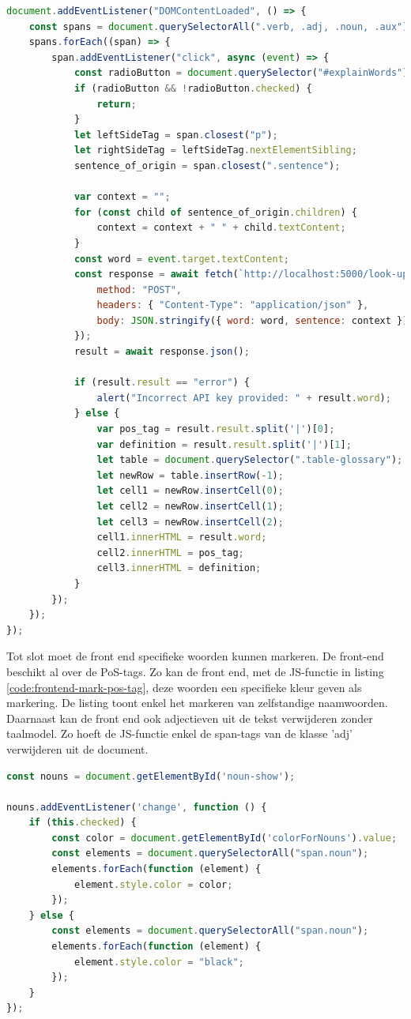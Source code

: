 \begin{lstlisting}[language=javascript, caption={Een woord aan de woordenlijst toevoegen in het scholierencomponent.}, label={code:frontend-add-word-to-glossary}]
document.addEventListener("DOMContentLoaded", () => {
	const spans = document.querySelectorAll(".verb, .adj, .noun, .aux");
	spans.forEach((span) => {
		span.addEventListener("click", async (event) => {
			const radioButton = document.querySelector("#explainWords");
			if (radioButton && !radioButton.checked) {
				return;
			}
			let leftSideTag = span.closest("p");
			let rightSideTag = leftSideTag.nextElementSibling;
			sentence_of_origin = span.closest(".sentence");
			
			var context = "";
			for (const child of sentence_of_origin.children) {
				context = context + " " + child.textContent;
			}
			const word = event.target.textContent;
			const response = await fetch(`http://localhost:5000/look-up-word`, {
				method: "POST",
				headers: { "Content-Type": "application/json" },
				body: JSON.stringify({ word: word, sentence: context }),
			});
			result = await response.json();
			
			if (result.result == "error") {
				alert("Incorrect API key provided: " + result.word);
			} else {
				var pos_tag = result.result.split('|')[0];
				var definition = result.result.split('|')[1];
				let table = document.querySelector(".table-glossary");
				let newRow = table.insertRow(-1);
				let cell1 = newRow.insertCell(0);
				let cell2 = newRow.insertCell(1);
				let cell3 = newRow.insertCell(2);
				cell1.innerHTML = result.word;
				cell2.innerHTML = pos_tag;
				cell3.innerHTML = definition;
			}
		});
	});
});
\end{lstlisting}


Tot slot moet de front end specifieke woorden kunnen markeren. De front-end beschikt al over de PoS-tags. Zo kan de front end, met de JS-functie in listing \ref{code:frontend-mark-pos-tag}, deze woorden een specifieke kleur geven als markering. De listing toont enkel het markeren van zelfstandige naamwoorden. Daarnaast kan de front end ook adjectieven uit de tekst verwijderen zonder taalmodel. Zo hoeft de JS-functie enkel de span-tags van de klasse 'adj' verwijderen uit de document.

\begin{lstlisting}[language=javascript, caption={Zelfstandige naamwoorden in het scholierencomponent markeren.}, label={code:frontend-mark-pos-tag}]
const nouns = document.getElementById('noun-show');

nouns.addEventListener('change', function () {
	if (this.checked) {
		const color = document.getElementById('colorForNouns').value;
		const elements = document.querySelectorAll("span.noun");
		elements.forEach(function (element) {
			element.style.color = color;
		});
	} else {
		const elements = document.querySelectorAll("span.noun");
		elements.forEach(function (element) {
			element.style.color = "black";
		});
	}
});
\end{lstlisting}

